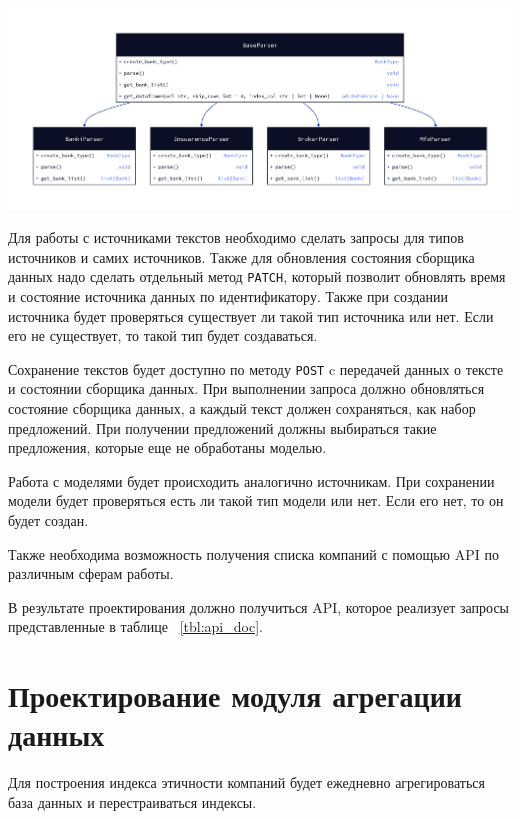 \documentclass[PI, VKR]{HSEUniversity}
\begin{document}
\begin{center}
\includegraphics[width=.9\linewidth]{img/d2/cbr_parser_class.png}
\end{center}

Для работы с источниками текстов необходимо сделать запросы для типов источников и самих источников. Также для обновления состояния сборщика данных надо сделать отдельный метод \texttt{PATCH}, который позволит обновлять время и состояние источника данных по идентификатору. Также при создании источника будет проверяться существует ли такой тип источника или нет. Если его не существует, то такой тип будет создаваться.

Сохранение текстов будет доступно по методу \texttt{POST} c передачей данных о тексте и состоянии сборщика данных. При выполнении запроса должно обновляться состояние сборщика данных, а каждый текст должен сохраняться, как набор предложений. При получении предложений должны выбираться такие предложения, которые еще не обработаны моделью.

Работа с моделями будет происходить аналогично источникам. При сохранении модели будет проверяться есть ли такой тип модели или нет. Если его нет, то он будет создан.

Также необходима возможность получения списка компаний с помощью API по различным сферам работы.

В результате проектирования должно получиться API, которое реализует запросы представленные в таблице ~\ref{tbl:api_doc}.
\section{Проектирование модуля агрегации данных}
\label{sec:orga878f09}
Для построения индекса этичности компаний будет ежедневно агрегироваться база данных и перестраиваться индексы.
\end{document}
